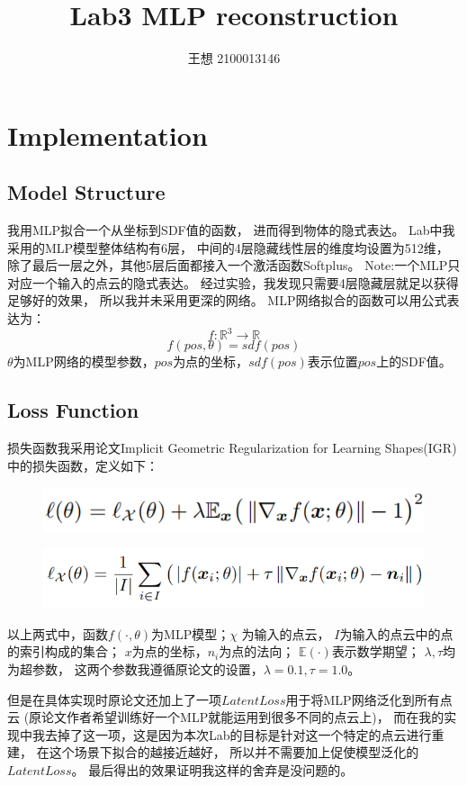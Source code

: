 \documentclass{ctexart}
\title{Lab3  MLP reconstruction}
\author{王想 2100013146}
\date{}
\begin{document}
\maketitle

\section{Implementation}
\subsection{Model Structure}
我用MLP拟合一个从坐标到SDF值的函数，
进而得到物体的隐式表达。
Lab中我采用的MLP模型整体结构有6层，
中间的4层隐藏线性层的维度均设置为512维，
除了最后一层之外，其他5层后面都接入一个激活函数Softplus。
Note:一个MLP只对应一个输入的点云的隐式表达。
经过实验，我发现只需要4层隐藏层就足以获得足够好的效果，
所以我并未采用更深的网络。
MLP网络拟合的函数可以用公式表达为：
$$f:\mathbb{R}^3 \rightarrow \mathbb{R} $$
$$f(pos ,\theta)=sdf(pos) $$
$\theta$为MLP网络的模型参数，$pos$为点的坐标，$sdf(pos)$表示位置$pos$上的SDF值。
$$ $$

\subsection{Loss Function}
损失函数我采用论文Implicit Geometric Regularization for Learning Shapes(IGR)
中的损失函数，定义如下：
\begin{figure}[htbp]
    \centering
    \includegraphics[width=0.4\linewidth]{figures/loss.png}
\end{figure}
\begin{figure}[htbp]
    \centering
    \includegraphics[width=0.5\linewidth]{figures/loss1.png}
\end{figure}

以上两式中，函数$f(\cdot ,\theta)$为MLP模型；$\chi$ 为输入的点云，
$I$为输入的点云中的点的索引构成的集合；
$x$为点的坐标，$n_i$为点的法向；
$\mathbb{E}(\cdot) $表示数学期望；
$\lambda, \tau $均为超参数，
这两个参数我遵循原论文的设置，$\lambda=0.1, \tau=1.0 $。

但是在具体实现时原论文还加上了一项$Latent Loss$用于将MLP网络泛化到所有点云
(原论文作者希望训练好一个MLP就能运用到很多不同的点云上)，
而在我的实现中我去掉了这一项，这是因为本次Lab的目标是针对这一个特定的点云进行重建，
在这个场景下拟合的越接近越好，
所以并不需要加上促使模型泛化的$Latent Loss$。
最后得出的效果证明我这样的舍弃是没问题的。
$$$$
\end{document}
